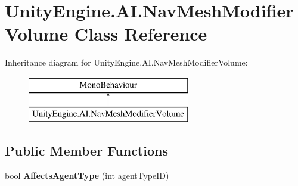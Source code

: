 \hypertarget{class_unity_engine_1_1_a_i_1_1_nav_mesh_modifier_volume}{}\section{Unity\+Engine.\+A\+I.\+Nav\+Mesh\+Modifier\+Volume Class Reference}
\label{class_unity_engine_1_1_a_i_1_1_nav_mesh_modifier_volume}
Inheritance diagram for Unity\+Engine.\+A\+I.\+Nav\+Mesh\+Modifier\+Volume\+:\begin{figure}[H]
\begin{center}
\leavevmode
\includegraphics[height=2.000000cm]{class_unity_engine_1_1_a_i_1_1_nav_mesh_modifier_volume}
\end{center}
\end{figure}
\subsection*{Public Member Functions}
\begin{DoxyCompactItemize}
\item 
\mbox{\label{class_unity_engine_1_1_a_i_1_1_nav_mesh_modifier_volume_a3683cc7829a40bdfd0371d1c9ca3d9e8}} 
bool {\bfseries Affects\+Agent\+Type} (int agent\+Type\+ID)
\end{DoxyCompactItemize}

